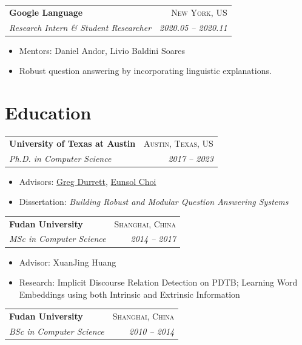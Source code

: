 \documentclass[11pt,letterpaper]{article}
\makeatletter
\newcommand{\entry}[4]{%
  \begin{tabularx}{\textwidth}{@{}X r@{}}
    \textbf{#1} & \textsc{\small\color{gray}#2}\\
    \emph{#3}   & \emph{\small\color{gray}#4}\\
  \end{tabularx}%
  \vspace{2pt}%
}
\newenvironment{tightlist}
  {\begin{itemize}[leftmargin=1.4em,topsep=2pt,itemsep=1pt,parsep=0pt]}
  {\end{itemize}}
\makeatother
\begin{document}
\entry{Google Language}{New York, US}{Research Intern \& Student Researcher}{2020.05 -- 2020.11}
\begin{tightlist}
  \item Mentors: Daniel Andor, Livio Baldini Soares
  \item Robust question answering by incorporating linguistic explanations.
\end{tightlist}

\section{Education}

\entry{University of Texas at Austin}{Austin, Texas, US}{Ph.D. in Computer Science}{2017 -- 2023}
\begin{tightlist}
  \item Advisors: \href{https://www.cs.utexas.edu/~gdurrett/}{Greg Durrett}, \href{https://eunsol.github.io/}{Eunsol Choi}
  \item Dissertation: \emph{Building Robust and Modular Question Answering Systems}
\end{tightlist}
\vspace{4pt}

\entry{Fudan University}{Shanghai, China}{MSc in Computer Science}{2014 -- 2017}
\begin{tightlist}
  \item Advisor: XuanJing Huang
  \item Research: Implicit Discourse Relation Detection on PDTB; Learning Word Embeddings
        using both Intrinsic and Extrinsic Information
\end{tightlist}
\vspace{4pt}

\entry{Fudan University}{Shanghai, China}{BSc in Computer Science}{2010 -- 2014}

\clearpage
\end{document}
